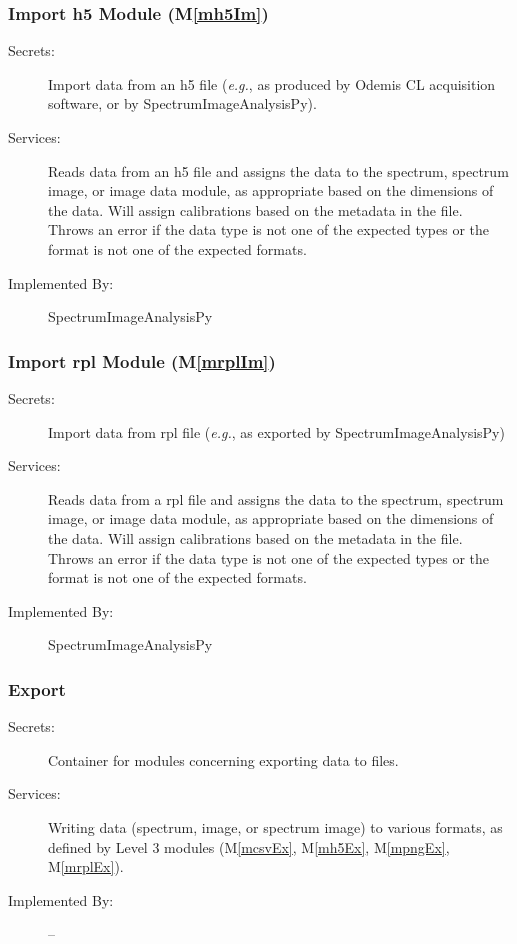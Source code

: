 \documentclass[12pt, titlepage]{article}
\newcommand{\mref}[1]{M\ref{#1}}
\newcommand{\progname}{SpectrumImageAnalysisPy}
\begin{document}
\subsubsection{Import h5 Module (\mref{mh5Im})}
\label{sssec:ImportH5}
\begin{description}
	\item[Secrets:]Import data from an h5 file (\textit{e.g.}, as produced by
Odemis CL acquisition software, or by \progname).
	\item[Services:]Reads data from an h5 file and assigns the data to the
spectrum, spectrum image, or image data module, as appropriate based on the
dimensions of the data. Will assign calibrations based on the metadata in the
file. Throws an error if the data type is not one of the expected types or the
format is not one of the expected formats.
	\item[Implemented By:] \progname
\end{description}

\subsubsection{Import rpl Module (\mref{mrplIm})}
\label{sssec:ImportRPL}
\begin{description}
	\item[Secrets:]Import data from rpl file (\textit{e.g.}, as exported by
\progname)
	\item[Services:]Reads data from a rpl file and assigns the data to the
spectrum, spectrum image, or image data module, as appropriate based on the
dimensions of the data. Will assign calibrations based on the metadata in the
file. Throws an error if the data type is not one of the expected types or the
format is not one of the expected formats.
	\item[Implemented By:] \progname
\end{description}

\subsubsection{Export}
\label{sssec:Export}
\begin{description}
	\item[Secrets:]Container for modules concerning exporting data to files.
	\item[Services:]Writing data (spectrum, image, or spectrum image) to various
formats, as defined by Level 3 modules (\mref{mcsvEx}, \mref{mh5Ex},
\mref{mpngEx}, \mref{mrplEx}).
	\item[Implemented By:] --
\end{description}
\end{document}
